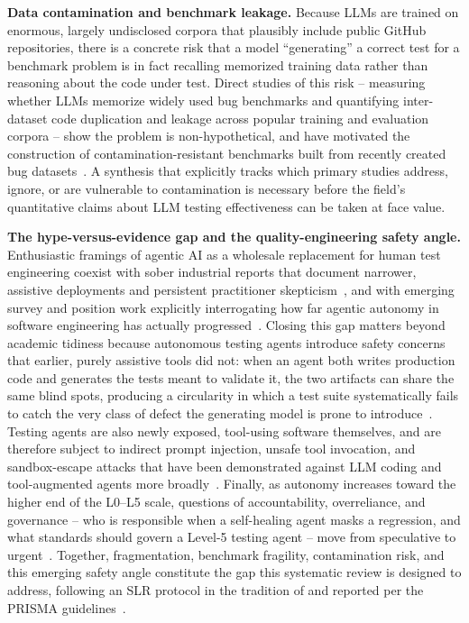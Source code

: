\textbf{Data contamination and benchmark leakage.} Because LLMs are
trained on enormous, largely undisclosed corpora that plausibly include
public GitHub repositories, there is a concrete risk that a model
``generating'' a correct test for a benchmark problem is in fact
recalling memorized training data rather than reasoning about the code
under test. Direct studies of this risk -- measuring whether LLMs
memorize widely used bug benchmarks and quantifying inter-dataset code
duplication and leakage across popular training and evaluation
corpora -- show the problem is non-hypothetical, and have motivated
the construction of contamination-resistant benchmarks built from
recently created bug
datasets~\cite{slr0302025,slr0322024,slr0312023,slr0292025}. A
synthesis that explicitly tracks which primary studies address, ignore,
or are vulnerable to contamination is necessary before the field's
quantitative claims about LLM testing effectiveness can be taken at
face value.

\textbf{The hype-versus-evidence gap and the quality-engineering safety
angle.} Enthusiastic framings of agentic AI as a wholesale replacement
for human test engineering coexist with sober industrial reports that
document narrower, assistive deployments and persistent practitioner
skepticism~\cite{slr0372025,slr0382024,slr0392025,slr0832025}, and with
emerging survey and position work explicitly interrogating how far
agentic autonomy in software engineering has actually
progressed~\cite{slr0662026,slr0692026,slr0722026,slr0842025,slr0852025}.
Closing this gap matters beyond academic tidiness because autonomous
testing agents introduce safety concerns that earlier, purely
assistive tools did not: when an agent both writes production code and
generates the tests meant to validate it, the two artifacts can share
the same blind spots, producing a circularity in which a test suite
systematically fails to catch the very class of defect the generating
model is prone to introduce~\cite{xu2025candor,slr0192025}. Testing
agents are also newly exposed, tool-using software themselves, and are
therefore subject to indirect prompt injection, unsafe tool
invocation, and sandbox-escape attacks that have been demonstrated
against LLM coding and tool-augmented agents more
broadly~\cite{zhan2024injecagent,debenedetti2024agentdojo,guo2024redcode,she2025queryipi,sakib2026trustverify,kozak2025developeraid,shi2025progent,wu2024isolategpt}.
Finally, as autonomy increases toward the higher end of the L0--L5
scale, questions of accountability, overreliance, and governance --
who is responsible when a self-healing agent masks a regression, and
what standards should govern a Level-5 testing agent -- move from
speculative to
urgent~\cite{treude2026accountable,cheng2026threepillar,passi2025overreliance,ibrahim2025overreliance,kiran2026humanai}.
Together, fragmentation, benchmark fragility, contamination risk, and
this emerging safety angle constitute the gap this systematic review
is designed to address, following an SLR protocol in the tradition of
\cite{kitchenham2007} and reported per the PRISMA
guidelines~\cite{page2021prisma}.
